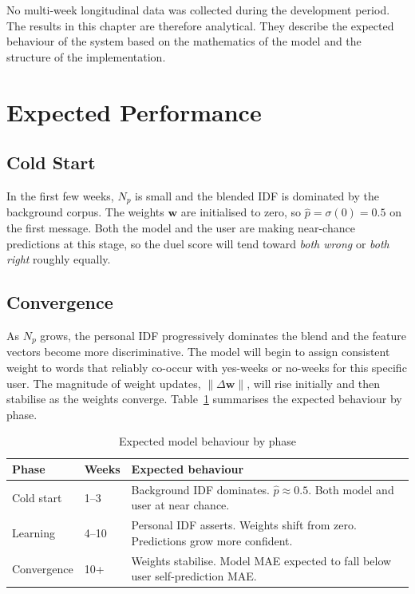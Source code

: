 \documentclass[11pt, a4paper]{report}
\begin{document}
No multi-week longitudinal data was collected during the development
period. The results in this chapter are therefore analytical. They describe
the expected behaviour of the system based on the mathematics of the model
and the structure of the implementation.

\section{Expected Performance}

\subsection{Cold Start}

In the first few weeks, $N_p$ is small and the blended IDF is dominated
by the background corpus. The weights $\mathbf{w}$ are initialised to
zero, so $\hat{p} = \sigma(0) = 0.5$ on the first message. Both the model
and the user are making near-chance predictions at this stage, so the duel
score will tend toward \textit{both wrong} or \textit{both right}
roughly equally.

\subsection{Convergence}

As $N_p$ grows, the personal IDF progressively dominates the blend and
the feature vectors become more discriminative. The model will begin to
assign consistent weight to words that reliably co-occur with yes-weeks
or no-weeks for this specific user. The magnitude of weight updates,
$\|\Delta\mathbf{w}\|$, will rise initially and then stabilise as the
weights converge. Table~\ref{tab:phases} summarises the expected
behaviour by phase.

\begin{table}[H]
\centering
\caption{Expected model behaviour by phase}
\label{tab:phases}
{\small
\begin{tabularx}{\textwidth}{@{} p{2.2cm} p{2.0cm} X @{}}
\toprule
\textbf{Phase} & \textbf{Weeks} & \textbf{Expected behaviour} \\
\midrule
Cold start   & 1--3   & Background IDF dominates. $\hat{p} \approx 0.5$.
                        Both model and user at near chance. \\[4pt]
Learning     & 4--10  & Personal IDF asserts. Weights shift from zero.
                        Predictions grow more confident. \\[4pt]
Convergence  & 10+    & Weights stabilise. Model MAE expected to fall
                        below user self-prediction MAE. \\
\bottomrule
\end{tabularx}}
\end{table}
\end{document}
